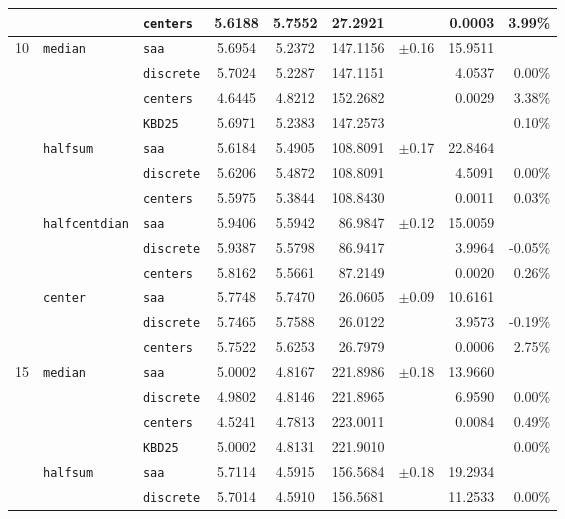 \documentclass[letter,11pt, reqno]{amsart}
\renewcommand{\;}{\quad}
\theoremstyle{thmstyleone}%
\theoremstyle{thmstyletwo}%
\theoremstyle{thmstylethree}%
\begin{document}
\begin{table}[h!]
\begin{adjustbox}{width=0.65\textwidth}
\begin{tabular}{@{} c l l c c r l r r @{}}
 & & \texttt{centers}  & 5.6188 & 5.7552 & 27.2921 & {}        & 0.0003  & 3.99\% \\
\midrule
{10}
 & {\texttt{median}}
   & \texttt{saa}      & 5.6954 & 5.2372 & 147.1156& $\pm$0.16 & 15.9511 & {} \\
 & & \texttt{discrete} & 5.7024 & 5.2287 & 147.1151& {}        & 4.0537  & 0.00\% \\
 & & \texttt{centers}  & 4.6445 & 4.8212 & 152.2682& {}        & 0.0029  & 3.38\% \\
 & & \texttt{KBD25}    & 5.6971 & 5.2383 & 147.2573& {}        & {}      & 0.10\% \\[2pt]
 & {\texttt{halfsum}}
   & \texttt{saa}      & 5.6184 & 5.4905 & 108.8091& $\pm$0.17 & 22.8464 & {} \\
 & & \texttt{discrete} & 5.6206 & 5.4872 & 108.8091& {}        & 4.5091  & 0.00\% \\
 & & \texttt{centers}  & 5.5975 & 5.3844 & 108.8430& {}        & 0.0011  & 0.03\% \\[2pt]
 & {\texttt{halfcentdian}}
   & \texttt{saa}      & 5.9406 & 5.5942 & 86.9847 & $\pm$0.12 & 15.0059 & {} \\
 & & \texttt{discrete} & 5.9387 & 5.5798 & 86.9417 & {}        & 3.9964  & -0.05\% \\
 & & \texttt{centers}  & 5.8162 & 5.5661 & 87.2149 & {}        & 0.0020  & 0.26\% \\[2pt]
 & {\texttt{center}}
   & \texttt{saa}      & 5.7748 & 5.7470 & 26.0605 & $\pm$0.09 & 10.6161 & {} \\
 & & \texttt{discrete} & 5.7465 & 5.7588 & 26.0122 & {}        & 3.9573  & -0.19\% \\
 & & \texttt{centers}  & 5.7522 & 5.6253 & 26.7979 & {}        & 0.0006  & 2.75\% \\
\midrule
{15}
 & {\texttt{median}}
   & \texttt{saa}      & 5.0002 & 4.8167 & 221.8986& $\pm$0.18 & 13.9660 & {} \\
 & & \texttt{discrete} & 4.9802 & 4.8146 & 221.8965& {}        & 6.9590  & 0.00\% \\
 & & \texttt{centers}  & 4.5241 & 4.7813 & 223.0011& {}        & 0.0084  & 0.49\% \\
 & & \texttt{KBD25}    & 5.0002 & 4.8131 & 221.9010& {}        & {}      & 0.00\% \\[2pt]
 & {\texttt{halfsum}}
   & \texttt{saa}      & 5.7114 & 4.5915 & 156.5684& $\pm$0.18 & 19.2934 & {} \\
 & & \texttt{discrete} & 5.7014 & 4.5910 & 156.5681& {}        & 11.2533 & 0.00\% \\

\end{tabular}
\end{adjustbox}
\end{table}
\end{document}
